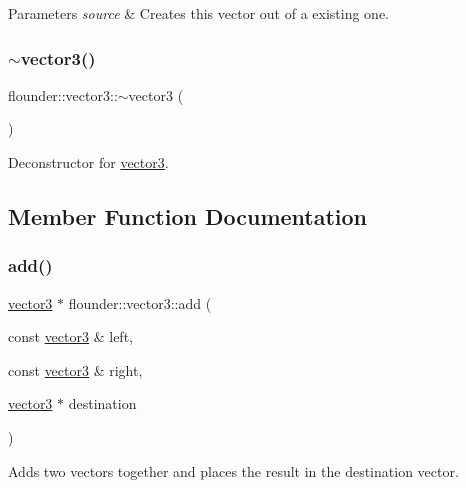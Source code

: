 \begin{DoxyParams}{Parameters}
{\em source} & Creates this vector out of a existing one. \\
\hline
\end{DoxyParams}
\mbox{\label{classflounder_1_1vector3_aa14d036046bc573cba8a2001f4f2031b}} 
\subsubsection{\texorpdfstring{$\sim$vector3()}{~vector3()}}
{\footnotesize\ttfamily flounder\+::vector3\+::$\sim$vector3 (\begin{DoxyParamCaption}{ }\end{DoxyParamCaption})}



Deconstructor for \hyperlink{classflounder_1_1vector3}{vector3}. 



\subsection{Member Function Documentation}
\mbox{\label{classflounder_1_1vector3_acd122d18a7cf02312f1f1b661208c9e3}} 
\subsubsection{\texorpdfstring{add()}{add()}}
{\footnotesize\ttfamily \hyperlink{classflounder_1_1vector3}{vector3} $\ast$ flounder\+::vector3\+::add (\begin{DoxyParamCaption}\item[{const \hyperlink{classflounder_1_1vector3}{vector3} \&}]{left,  }\item[{const \hyperlink{classflounder_1_1vector3}{vector3} \&}]{right,  }\item[{\hyperlink{classflounder_1_1vector3}{vector3} $\ast$}]{destination }\end{DoxyParamCaption})\hspace{0.3cm}{\ttfamily [static]}}



Adds two vectors together and places the result in the destination vector. 


